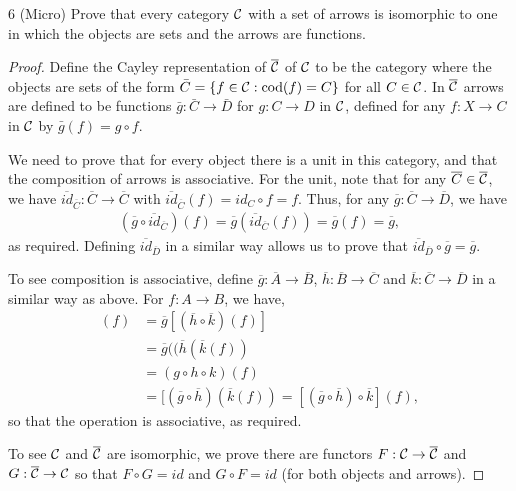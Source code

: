 \begin{exercise}{6 (Micro)}
Prove that every category $\mathcal{C}$ with a set of arrows is isomorphic to one in which the objects are sets and the arrows are functions.
\end{exercise}
\begin{proof}
Define the Cayley representation of $\overline{\mathcal{C}}$ of $\mathcal{C}$ to be the category where the objects are sets of the form $\bar{C} = \{f \in \mathcal{C}: \operatorname{cod}(f) = C\}$ for all $C \in \mathcal{C}$.
In $\overline{\mathcal{C}}$ arrows are defined to be functions $\bar{g}: \bar{C} \to \bar{D}$ for $g: C \to D$ in $\mathcal{C}$, defined for any $f: X \to C$ in $\mathcal{C}$ by $\bar{g}(f) = g \circ f$.

We need to prove that for every object there is a unit in this category, and that the composition of arrows is associative.
For the unit, note that for any $\overline{C} \in \overline{\mathcal{C}}$, we have $\overline{id}_{\overline{C}}: \overline{C} \to \overline{C}$ with $\overline{id}_{\overline{C}}(f) = id_C \circ f = f$.
Thus, for any $\overline{g}: \overline{C} \to \overline{D}$, we have 
\begin{align*}
    (\overline{g} \circ \overline{id}_{\overline{C}})(f) 
    = \overline{g}(\overline{id}_{\overline{C}}(f)) 
    = \overline{g}(f) 
    = \overline{g},
\end{align*}
as required.
Defining $\overline{id}_{\overline{D}}$ in a similar way allows us to prove that $\overline{id}_{\overline{D}} \circ \overline{g} = \overline{g}$.

To see composition is associative, define $\overline{g}: \overline{A} \to \overline{B}$, $\overline{h}: \overline{B} \to \overline{C}$ and $\overline{k}: \overline{C} \to \overline{D}$ in a similar way as above.
For $f: A \to B$, we have,
\begin{align*}
    [\overline{g} \circ (\overline{h} \circ \overline{k})](f)
    &= \overline{g}[(\overline{h} \circ \overline{k})(f)]\\
    &= \overline{g}((\overline{h}(\overline{k}(f))\\
    &= (g \circ h \circ k)(f)\\
    &= [(\overline{g} \circ \overline{h})(\overline{k}(f))
    = [(\overline{g} \circ \overline{h}) \circ \overline{k}](f),
\end{align*}
so that the operation is associative, as required.

To see $\mathcal{C}$ and $\overline{\mathcal{C}}$ are isomorphic, we prove there are functors $F: \mathcal{C} \to \overline{\mathcal{C}}$ and $G: \overline{\mathcal{C}} \to \mathcal{C}$ so that $F \circ G = id$ and $G \circ F = id$ (for both objects and arrows).


\end{proof}
